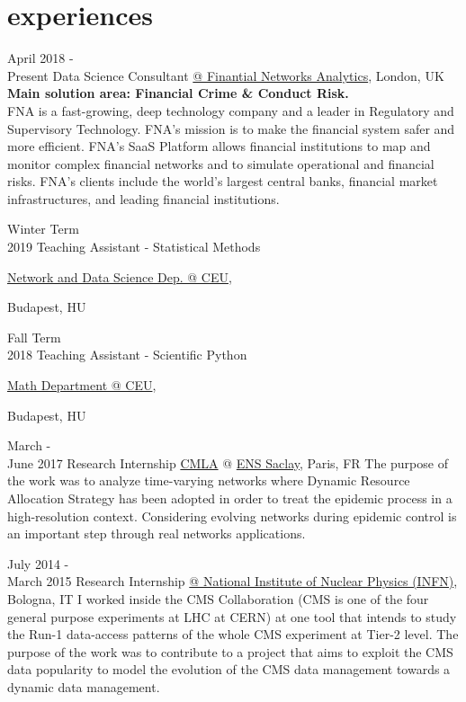 \documentclass[]{cv-style}     %
\begin{document}
\section{experiences}
\begin{entrylist}
\entry
{April 2018 - \\Present}
{Data Science Consultant}
{\href{http://www.fna.fi}{@ Finantial Networks Analytics}, London, UK}
{\footnotesize{\textbf{Main solution area: Financial Crime \& Conduct Risk.}}\\
FNA is a fast-growing, deep technology company and a leader in Regulatory and Supervisory
Technology. FNA's mission is to make the financial system safer and more efficient. FNA's SaaS Platform allows financial institutions to map and monitor complex financial networks and to simulate operational and financial risks. FNA’s clients include the world’s largest central banks, financial market infrastructures, and leading financial institutions.
}

\entry
{Winter Term\\2019}
{Teaching Assistant - Statistical Methods}
{\href{http://www.ceu.edu}{Network and Data Science Dep. @ CEU},
\begin{flushright}Budapest, HU
 \end{flushright}
}
{}
\entry
{Fall Term\\2018}
{Teaching Assistant - Scientific Python}
{\href{http://www.ceu.edu}{Math Department @ CEU},
\begin{flushright}Budapest, HU
 \end{flushright}
}
{}
\entry
{March -\\June 2017}
{Research Internship}
{\href{http://www.cmla.ens-cachan.fr/}{CMLA} @ \href{http://www.ens-cachan.fr/}{ENS Saclay}, Paris, FR}
{The purpose of the work was to analyze time-varying networks where Dynamic Resource Allocation Strategy has been adopted in order to treat the epidemic process in a high-resolution context. Considering evolving networks during epidemic control is an important step through real networks applications.}
\end{entrylist}
\begin{entrylist}
\entry
{July 2014 -\\March 2015}
{Research Internship}
{\href{http://home.infn.it/it/}{@ National Institute of Nuclear Physics (INFN)}, Bologna, IT}
{
I worked inside the CMS Collaboration (CMS is one of the four general purpose
    experiments at LHC at CERN) at one tool that intends to study the Run-1
    data-access patterns of the whole CMS experiment at Tier-2 level.
    The purpose of the work was to contribute to a project that aims to
    exploit the CMS data popularity to model the evolution of the CMS
data management towards a dynamic data management.
}
\end{entrylist}
\end{document}
